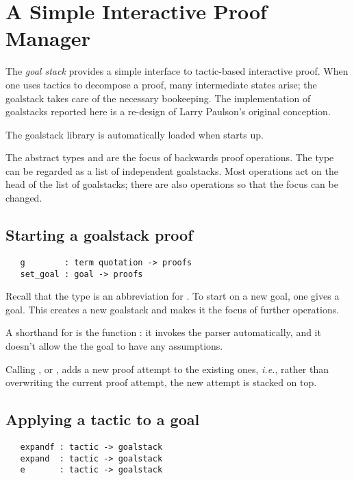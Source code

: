 {\section{A Simple Interactive Proof Manager}\label{sec:goalstack}

The \emph{goal stack} provides a simple interface to tactic-based
interactive proof. When one uses tactics to decompose a proof, many
intermediate states arise; the goalstack takes care of the necessary
bookeeping. The implementation of goalstacks reported here is a
re-design of Larry Paulson's original conception.

The goalstack library is automatically loaded when \HOL{} starts up.

The abstract types  and  are the
focus of backwards proof operations. The type  can be
regarded as a list of independent goalstacks. Most operations act on
the head of the list of goalstacks; there are also operations so that
the focus can be changed.

\subsection{Starting a goalstack proof}

\begin{hol}
\begin{verbatim}
   g        : term quotation -> proofs
   set_goal : goal -> proofs
\end{verbatim}
\end{hol}

Recall that the type  is an abbreviation for
. To start on a new goal, one gives
 a goal. This creates a new goalstack and makes it the
focus of further operations.

A shorthand for  is the function : it
invokes the parser automatically, and it doesn't allow the the goal to
have any assumptions.

Calling , or , adds a new proof attempt to the
existing ones, \textit{i.e.}, rather than overwriting the current
proof attempt, the new attempt is stacked on top.

\subsection{Applying a tactic to a goal}

\begin{hol}
\begin{verbatim}
   expandf : tactic -> goalstack
   expand  : tactic -> goalstack
   e       : tactic -> goalstack
\end{verbatim}
\end{hol}

}
